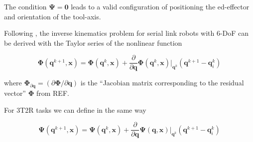 \documentclass[twocolumn,10pt]{IFTOMM}
\newcommand{\bm}[1]{\boldsymbol{#1}}
\newcommand{\rotmat}[2]{{{ }^{#1}\boldsymbol{R}}_{#2}}
\newcommand{\transp}[0]{{\mathrm{T}}}
\begin{document}
The condition $\bm{\Psi}=\bm{0}$ leads to a valid configuration of positioning the ed-effector and orientation of the tool-axis.




%
%
%




Following \cite{GoldenbergBenFen1985}, the inverse kinematics problem for serial link robots with 6-DoF can be derived with the Taylor series of the nonlinear function 

\begin{equation}
\bm{\Phi}(\bm{q}^{k+1},\bm{x}) = 
\bm{\Phi}(\bm{q}^{k},\bm{x})
+
\frac{\partial}{\partial \bm{q}} \bm{\Phi}(\bm{q}^k,\bm{x}) \biggr\rvert_{\bm{q}^k} (\bm{q}^{k+1} - \bm{q}_i^k)
\end{equation}

where $\bm{\Phi}_{\partial\bm{q}}=(\partial \bm{\Phi} / \partial \bm{q})$ is the ``Jacobian matrix corresponding to the residual vector'' $\bm{\Phi}$ from REF.

For 3T2R tasks we can define in the same way
 
\begin{equation}
\bm{\Psi}(\bm{q}^{k+1},\bm{x}) = 
\bm{\Psi}(\bm{q}^{k},\bm{x})
+
\frac{\partial}{\partial \bm{q}} \bm{\Psi}(\bm{q},\bm{x}) \biggr\rvert_{\bm{q}^k} (\bm{q}^{k+1} - \bm{q}_i^k)
\end{equation}
\end{document}

